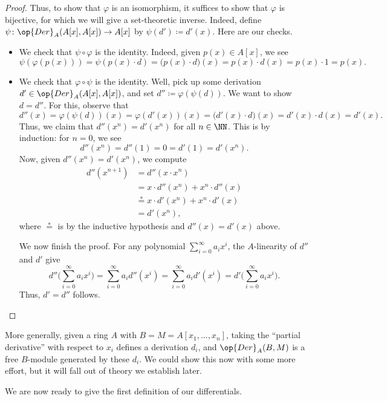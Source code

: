 \documentclass[../notes.tex]{subfiles}
\begin{document}
\begin{proof}
	Thus, to show that $\varphi$ is an isomorphism, it suffices to show that $\varphi$ is bijective, for which we will give a set-theoretic inverse. Indeed, define $\psi\colon\op{Der}_A(A[x],A[x])\to A[x]$ by $\psi(d')\coloneqq d'(x)$. Here are our checks.
	\begin{itemize}
		\item We check that $\psi\circ\varphi$ is the identity. Indeed, given $p(x)\in A[x]$, we see
		\[\psi(\varphi(p(x)))=\psi(p(x)\cdot d)=\big(p(x)\cdot d\big)(x)=p(x)\cdot d(x)=p(x)\cdot1=p(x).\]
		\item We check that $\varphi\circ\psi$ is the identity. Well, pick up some derivation $d'\in\op{Der}_A(A[x],A[x])$, and set $d''\coloneqq\varphi(\psi(d))$. We want to show $d=d''$. For this, observe that
		\[d''(x)=\varphi(\psi(d))(x)=\varphi(d'(x))(x)=\big(d'(x)\cdot d\big)(x)=d'(x)\cdot d(x)=d'(x).\]
		Thus, we claim that $d''\left(x^n\right)=d'\left(x^n\right)$ for all $n\in\NN$. This is by induction: for $n=0$, we see
		\[d''\left(x^n\right)=d''(1)=0=d'(1)=d'\left(x^n\right).\]
		Now, given $d''\left(x^n\right)=d'\left(x^n\right)$, we compute
		\begin{align*}
			d''\left(x^{n+1}\right) &= d''\left(x\cdot x^n\right) \\
			&= x\cdot d''\left(x^n\right)+x^n\cdot d''(x) \\
			&\stackrel*= x\cdot d'\left(x^n\right)+x^n\cdot d'(x) \\
			&= d'\left(x^n\right),
		\end{align*}
		where $\stackrel*=$ is by the inductive hypothesis and $d''(x)=d'(x)$ above.

		We now finish the proof. For any polynomial $\sum_{i=0}^\infty a_ix^i$, the $A$-linearity of $d''$ and $d'$ give
		\[d''\Bigg(\sum_{i=0}^\infty a_ix^i\Bigg)=\sum_{i=0}^\infty a_id''\left(x^i\right)=\sum_{i=0}^\infty a_id'\left(x^i\right)=d'\Bigg(\sum_{i=0}^\infty a_ix^i\Bigg).\]
		Thus, $d'=d''$ follows.
		\qedhere
	\end{itemize}
\end{proof}
\begin{remark}
	More generally, given a ring $A$ with $B=M=A[x_1,\ldots,x_n]$, taking the ``partial derivative'' with respect to $x_i$ defines a derivation $d_i$, and $\op{Der}_A(B,M)$ is a free $B$-module generated by these $d_i$. We could show this now with some more effort, but it will fall out of theory we establish later.
\end{remark}
We are now ready to give the first definition of our differentials.
\end{document}
